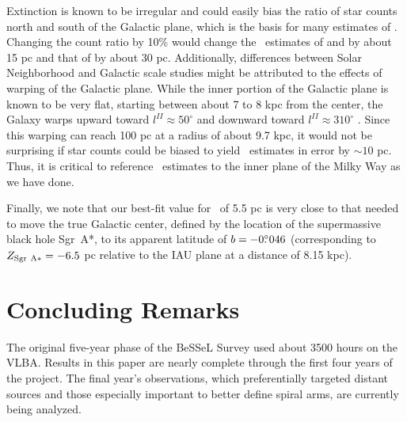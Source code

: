 \documentclass[12pt,preprint]{aastex}
\def\SgrA {Sgr~A*}
\def\d    {\ifmmode {{\rlap{.}}^\circ}\else {${\rlap{.}}^\circ$}\fi}
\def\Zsun  {\ifmmode {Z_\odot}\else {$Z_\odot$}\fi}
\begin{document}
Extinction is known to be irregular and could easily bias the ratio of star counts 
north and south of the Galactic plane, which is the basis for many estimates of \Zsun.
Changing the count ratio by 10\% would change the \Zsun\ estimates of
\citet{Humphreys:95} and \citet{Chen:01} by about 15 pc and that of
\citet{Yamagata:92} by about 30 pc.   
Additionally, differences between Solar Neighborhood and Galactic scale studies
might be attributed to the effects of warping of the Galactic plane.  
While the inner portion of the Galactic plane is known to be very flat,
starting between about 7 to 8 kpc from the center, the Galaxy warps upward
toward $l^{II}\approx50^\circ$ and downward toward $l^{II}\approx310^\circ$
\citep[see][noting their use of the old Galactic longitude system $l^I$]{Gum:60}.  
Since this warping can reach 100 pc at a radius of about 9.7 kpc, it would
not be surprising if star counts could be biased to yield \Zsun\ estimates
in error by $\sim10$ pc.  Thus, it is critical to reference \Zsun\ estimates
to the inner plane of the Milky Way as we have done.

Finally, we note that our best-fit value for \Zsun\ of 5.5 pc is very close to that 
needed to move the true Galactic center, defined by the location of
the supermassive black hole \SgrA, to its apparent latitude of 
$b=-0\d046$ (corresponding to $Z_{\rm \SgrA}=-6.5$ pc relative to the IAU 
plane at a distance of 8.15 kpc).  





\section{Concluding Remarks}\label{sect:future}

The original five-year phase of the BeSSeL Survey used about 3500 hours on the VLBA.
Results in this paper are nearly complete through the first four years of the project.
The final year's observations, which preferentially targeted distant sources and 
those especially important to better define spiral arms, are currently being 
analyzed.  
\end{document}
